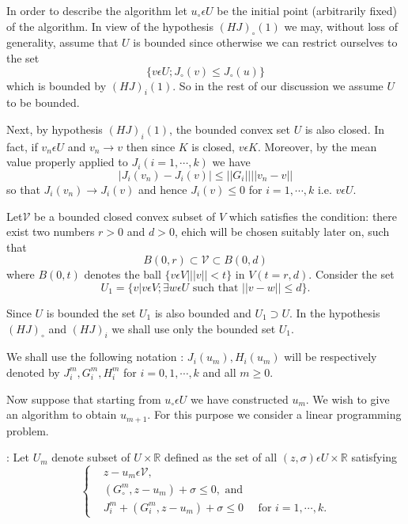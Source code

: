 In order to describe the algorithm let $u_{\circ} \epsilon U$ be the initial point (arbitrarily fixed) of the algorithm. In view of the hypothesis $(HJ)_{\circ} (1)$ we may, without loss of generality, assume that $U$ is bounded since otherwise we can restrict ourselves to the set
$$
\{v \epsilon U ; J_{\circ} (v) \leq J_{\circ} (u)\}
$$
which is bounded by $(HJ)_{i} (1)$. So in the rest of our discussion we assume $U$ to be bounded.

Next, by hypothesis $(HJ)_i (1)$, the bounded convex set $U$ is also closed. In fact, if $v_{n} \epsilon U$ and $v_{n} \to v$ then since $K$ is closed, $v \epsilon K$. Moreover, by the mean value properly applied to $J_{i} (i = 1, \cdots , k)$ we have
$$
|J_{i} (v_{n}) - J_{i} (v)| \leq ||G_{i}|| ||v_{n}-v||
$$
so that $J_{i}(v_{n}) \to J_{i}(v)$ and hence $J_{i}(v) \leq 0$ for $i=1, \cdots , k$ i.e. $v \epsilon U$.

Let\pageoriginale $\mathscr{V}$ be a bounded closed convex subset of $V$ which satisfies the condition: there exist two numbers $r > 0$ and $d > 0$, ehich will be chosen suitably later on, such that
$$
B(0, r) \subset \mathscr{V} \subset B(0, d)
$$
where $B(0, t)$ denotes the ball $\{v \epsilon V | ||v|| < t \}$ in $V (t = r, d)$. Consider the set 
$$
U_{1} = \{v | v \epsilon V ; \exists w \epsilon U \text{ such that } ||v-w||\leq d\}.
$$

Since $U$ is bounded the set $U_{1}$ is also bounded and $U_{1} \supset U$. In the hypothesis $(HJ)_{\circ}$ and $(HJ)_{i}$ we shall use only the bounded set $U_{1}$.

We shall use the following notation : $J_{i}(u_{m}), H_{i}(u_{m})$ will be respectively denoted by $J_{i}^{m}, G_{i}^{m}, H_{i}^{m}$ for $i = 0, 1, \cdots, k $ and all $m \geq 0$.

Now suppose that starting from $u_{\circ} \epsilon U$ we have constructed $u_{m}$. We wish to give an algorithm to obtain $u_{m+1}$. For this purpose we consider a linear programming problem.

\medskip
{}: Let $U_{m}$ denote subset of $U \times \mathbb{R}$ defined as the set of all $(z, \sigma) \epsilon U \times \mathbb{R}$ satisfying
\begin{equation*}
\begin{cases}
& z-u_{m} \epsilon \mathscr{V},\\
& (G_{\circ}^{m}, z-u_{m}) + \sigma \leq 0, \text{ and }\\
& J_{i}^{m} + (G_{i}^{m}, z-u_{m}) + \sigma \leq 0 \quad\text{ for } i = 1, \cdots, k.
\end{cases}
\end{equation*}

